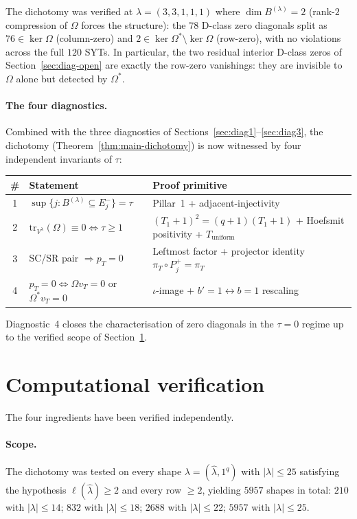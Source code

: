 \documentclass[11pt]{article}
\theoremstyle{definition}
\newcommand{\Vlam}{V^{\lambda}}
\newcommand{\Om}{\Omega}
\newcommand{\bla}{\widehat\lambda}
\newcommand{\elh}{\ell(\bla)}
\newcommand{\tr}{\mathrm{tr}}
\newcommand{\Eminus}{E^{-}}
\newcommand{\Tunif}{T_{\mathrm{uniform}}}
\begin{document}
The dichotomy was verified at $\lambda = (3, 3, 1, 1, 1)$ where
$\dim B^{(\lambda)} = 2$ (rank-$2$ compression of $\Om$ forces the
structure): the $78$ D-class zero diagonals split as $76 \in \ker \Om$
(column-zero) and $2 \in \ker \Om^{*} \setminus \ker \Om$ (row-zero), with
no violations across the full $120$ SYTs.  In particular, the two
residual interior D-class zeros of Section~\ref{sec:diag-open} are
exactly the row-zero vanishings: they are invisible to $\Om$ alone but
detected by $\Om^{*}$.

\paragraph{The four diagnostics.}  Combined with the three diagnostics of
Sections~\ref{sec:diag1}--\ref{sec:diag3}, the dichotomy
(Theorem~\ref{thm:main-dichotomy}) is now witnessed by four independent
invariants of $\tau$:

\begin{center}
\begin{tabular}{c l l}
\toprule
\# & Statement & Proof primitive \\
\midrule
1 & $\sup\{j : B^{(\lambda)} \subseteq \Eminus_j\} = \tau$
  & Pillar~1 + adjacent-injectivity \\
2 & $\tr_{\Vlam}(\Om) \equiv 0 \iff \tau \ge 1$
  & $(T_1+1)^2 = (q+1)(T_1+1)$ + Hoefsmit positivity + $\Tunif$ \\
3 & SC/SR pair $\Rightarrow p_T = 0$
  & Leftmost factor + projector identity $\pi_T \circ P^{+}_j = \pi_T$ \\
4 & $p_T = 0 \iff \Om v_T = 0$ or $\Om^{*} v_T = 0$
  & $\iota$-image + $b' = 1 \leftrightarrow b = 1$ rescaling \\
\bottomrule
\end{tabular}
\end{center}

\noindent Diagnostic~4 closes the characterisation of zero diagonals in
the $\tau = 0$ regime up to the verified scope of
Section~\ref{sec:verify}.

\section{Computational verification}\label{sec:verify}

The four ingredients have been verified independently.

\paragraph{Scope.}  The dichotomy was tested on every shape $\lambda = (\bla, 1^q)$ with $|\lambda| \le 25$ satisfying the hypothesis $\elh \ge 2$ and every row $\ge 2$, yielding $5957$ shapes in total: $210$ with $|\lambda| \le 14$; $832$ with $|\lambda| \le 18$; $2688$ with $|\lambda| \le 22$; $5957$ with $|\lambda| \le 25$.
\end{document}
